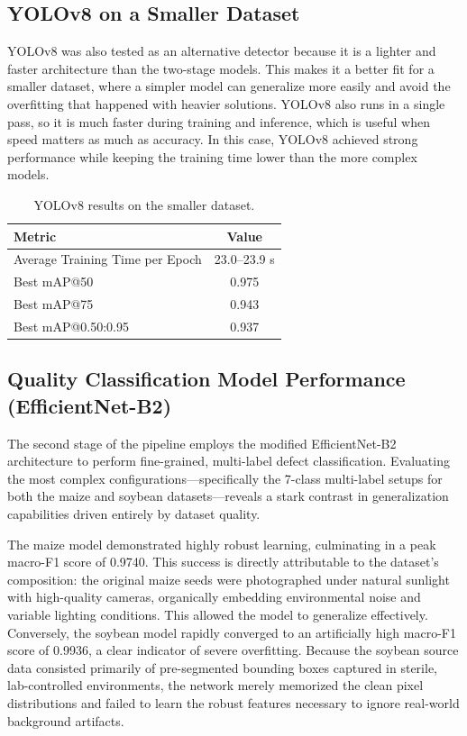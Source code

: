 \subsection{YOLOv8 on a Smaller Dataset}

YOLOv8 was also tested as an alternative detector because it is a lighter and faster architecture than the two-stage models. This makes it a better fit for a smaller dataset, where a simpler model can generalize more easily and avoid the overfitting that happened with heavier solutions. YOLOv8 also runs in a single pass, so it is much faster during training and inference, which is useful when speed matters as much as accuracy. In this case, YOLOv8 achieved strong performance while keeping the training time lower than the more complex models.

\begin{table}[h]
\centering
\begin{tabular}{l c}
\hline
Metric & Value \\
\hline
Average Training Time per Epoch & 23.0--23.9 s \\
Best mAP@50 & 0.975 \\
Best mAP@75 & 0.943 \\
Best mAP@0.50:0.95 & 0.937 \\
\hline
\end{tabular}
\caption{YOLOv8 results on the smaller dataset.}
\label{tab:yolov8_results}
\end{table}

\subsection{Quality Classification Model Performance (EfficientNet-B2)}
\label{sec:ch6-classification}

The second stage of the pipeline employs the modified EfficientNet-B2 architecture to perform fine-grained, multi-label defect classification. Evaluating the most complex configurations—specifically the 7-class multi-label setups for both the maize and soybean datasets—reveals a stark contrast in generalization capabilities driven entirely by dataset quality.

The maize model demonstrated highly robust learning, culminating in a peak macro-F1 score of 0.9740. This success is directly attributable to the dataset's composition: the original maize seeds were photographed under natural sunlight with high-quality cameras, organically embedding environmental noise and variable lighting conditions. This allowed the model to generalize effectively. Conversely, the soybean model rapidly converged to an artificially high macro-F1 score of 0.9936, a clear indicator of severe overfitting. Because the soybean source data consisted primarily of pre-segmented bounding boxes captured in sterile, lab-controlled environments, the network merely memorized the clean pixel distributions and failed to learn the robust features necessary to ignore real-world background artifacts.

